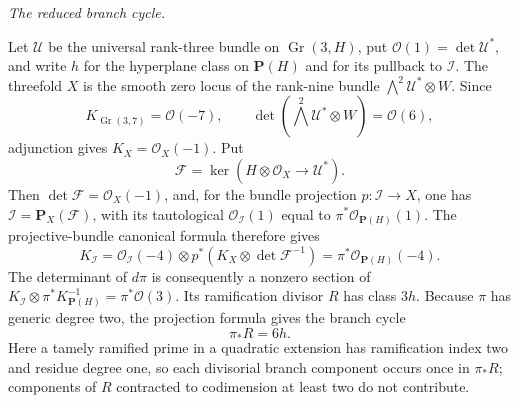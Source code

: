 \smallskip
\noindent\emph{The reduced branch cycle.}\par
Let \(\mathcal U\) be the universal rank-three bundle on
\(\operatorname{Gr}(3,H)\), put
\(\mathcal O(1)=\det\mathcal U^*\), and write \(h\) for the hyperplane
class on \(\mathbf P(H)\) and for its pullback to \(\mathcal I\).
The threefold \(X\) is the smooth zero locus of the rank-nine bundle
\(\bigwedge^2\mathcal U^*\otimes W\).  Since
\[
 K_{\operatorname{Gr}(3,7)}=\mathcal O(-7),\qquad
 \det(\bigwedge^2\mathcal U^*\otimes W)=\mathcal O(6),
\]
adjunction gives \(K_X=\mathcal O_X(-1)\).  Put
\[
 \mathcal F=\ker(H\otimes\mathcal O_X\longrightarrow\mathcal U^*).
\]
Then \(\det\mathcal F=\mathcal O_X(-1)\), and, for the bundle projection
\(p:\mathcal I\to X\), one has
\(\mathcal I=\mathbf P_X(\mathcal F)\), with its tautological
\(\mathcal O_{\mathcal I}(1)\) equal to
\(\pi^*\mathcal O_{\mathbf P(H)}(1)\).  The projective-bundle canonical
formula therefore gives
\[
 K_{\mathcal I}
 =\mathcal O_{\mathcal I}(-4)\otimes
   p^*(K_X\otimes\det\mathcal F^{-1})
 =\pi^*\mathcal O_{\mathbf P(H)}(-4).
\]
The determinant of \(d\pi\) is consequently a nonzero section of
\(K_{\mathcal I}\otimes\pi^*K_{\mathbf P(H)}^{-1}
 =\pi^*\mathcal O(3)\).  Its ramification divisor \(R\) has class \(3h\).
Because \(\pi\) has generic degree two, the projection formula gives the
branch cycle
\begin{equation}
\label{eq:branch-cycle}
 \pi_*R=6h.
\end{equation}
Here a tamely ramified prime in a quadratic extension has ramification
index two and residue degree one, so each divisorial branch component occurs
once in \(\pi_*R\); components of \(R\) contracted to codimension at least
two do not contribute.

